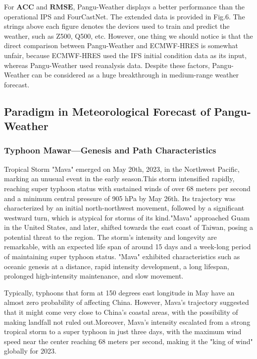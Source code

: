\documentclass[conference]{IEEEtran}
\begin{document}
For $\mathbf{ACC}$ and $\mathbf{RMSE}$, Pangu-Weather displays a better performance than the operational IPS and FourCastNet. The extended data is provided in Fig.6. The strings above each figure denotes the devices used to train and predict the weather, such as Z500, Q500, etc. However, one thing we should notice is that the direct comparison between Pangu-Weather and ECMWF-HRES is somewhat unfair, because ECMWF-HRES used the IFS initial condition data as its input, whereas Pangu-Weather used reanalysis data. Despite these factors, Pangu-Weather can be considered as a huge breakthrough in medium-range weather forecast.

\subsection{Paradigm in Meteorological Forecast of Pangu-Weather}
\subsubsection{Typhoon Mawar---Genesis and Path Characteristics}
Tropical Storm "Mava" emerged on May 20th, 2023, in the Northwest Pacific, marking an unusual event in the early season\cite{b55}.This storm intensified rapidly, reaching super typhoon status with sustained winds of over 68 meters per second and a minimum central pressure of 905 hPa by May 26th. Its trajectory was characterized by an initial north-northwest movement, followed by a significant westward turn, which is atypical for storms of its kind\cite{b56}."Mava" approached Guam in the United States, and later, shifted towards the east coast of Taiwan, posing a potential threat to the region. The storm's intensity and longevity are remarkable, with an expected life span of around 15 days and a week-long period of maintaining super typhoon status. "Mava" exhibited characteristics such as oceanic genesis at a distance, rapid intensity development, a long lifespan, prolonged high-intensity maintenance, and slow movement.

Typically, typhoons that form at 150 degrees east longitude in May have an almost zero probability of affecting China. However, Mava's trajectory suggested that it might come very close to China's coastal areas, with the possibility of making landfall not ruled out\cite{b57}.Moreover, Mava's intensity escalated from a strong tropical storm to a super typhoon in just three days, with the maximum wind speed near the center reaching 68 meters per second, making it the "king of wind" globally for 2023. 
\end{document}
